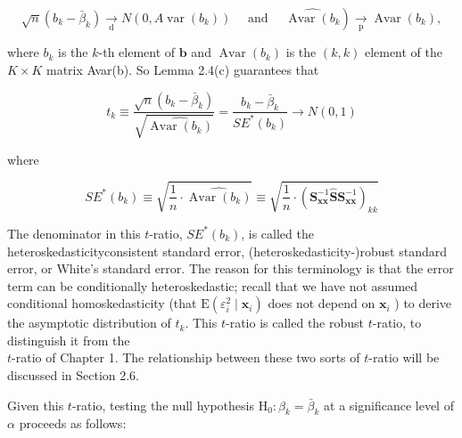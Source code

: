 \documentclass[10pt]{article}
\begin{document}
$$
\left.\sqrt{n}\left(b_{k}-\bar{\beta}_{k}\right) \underset{\mathrm{d}}{\rightarrow} N\left(0, A \operatorname{var}\left(b_{k}\right)\right) \quad \text { and } \quad \widehat{\operatorname{Avar}\left(b_{k}\right.}\right) \underset{\mathrm{p}}{\rightarrow} \operatorname{Avar}\left(b_{k}\right),
$$

where $b_{k}$ is the $k$-th element of $\mathbf{b}$ and $\operatorname{Avar}\left(b_{k}\right)$ is the $(k, k)$ element of the $K \times K$ matrix Avar(b). So Lemma 2.4(c) guarantees that


\begin{equation*}
t_{k} \equiv \frac{\sqrt{n}\left(b_{k}-\bar{\beta}_{k}\right)}{\sqrt{\widehat{\operatorname{Avar}\left(b_{k}\right)}}}=\frac{b_{k}-\bar{\beta}_{k}}{S E^{*}\left(b_{k}\right)} \rightarrow N(0,1) \tag{2.4.1}
\end{equation*}


where

$$
S E^{*}\left(b_{k}\right) \equiv \sqrt{\frac{1}{n} \cdot \widehat{\operatorname{Avar}\left(b_{k}\right)}} \equiv \sqrt{\frac{1}{n} \cdot\left(\mathbf{S}_{\mathbf{x x}}^{-1} \widehat{\mathbf{S}} \mathbf{S}_{\mathbf{x x}}^{-1}\right)_{k k}}
$$

The denominator in this $t$-ratio, $S E^{*}\left(b_{k}\right)$, is called the heteroskedasticityconsistent standard error, (heteroskedasticity-)robust standard error, or White's standard error. The reason for this terminology is that the error term can be conditionally heteroskedastic; recall that we have not assumed conditional homoskedasticity (that $\mathrm{E}\left(\varepsilon_{i}^{2} \mid \mathbf{x}_{i}\right)$ does not depend on $\mathbf{x}_{i}$ ) to derive the asymptotic distribution of $t_{k}$. This $t$-ratio is called the robust $t$-ratio, to distinguish it from the\\
$t$-ratio of Chapter 1. The relationship between these two sorts of $t$-ratio will be discussed in Section 2.6.

Given this $t$-ratio, testing the null hypothesis $\mathrm{H}_{0}: \beta_{k}=\bar{\beta}_{k}$ at a significance level of $\alpha$ proceeds as follows:
\end{document}
